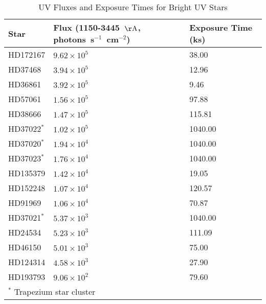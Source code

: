 \begin{table*}
\caption{UV Fluxes and Exposure Times for Bright UV Stars\label{tab:star_fluxes}}
\begin{center}
\begin{tabular}{lll}
\hline
\hline
Star & Flux (1150-3445~${\rm \AA}$, photons~s$^{-1}$~cm$^{-2}$) & Exposure Time (ks) \\
\hline
HD172167 & $9.62 \times 10^5$ & 38.00 \\
HD37468 & $3.94 \times 10^5$ & 12.96 \\
HD36861 & $3.92 \times 10^5$ & 9.46 \\
HD57061 & $1.56 \times 10^5$ & 97.88 \\
HD38666 & $1.47 \times 10^5$ & 115.81 \\
HD37022$^*$ & $1.02 \times 10^5$ & 1040.00 \\
HD37020$^*$ & $1.94 \times 10^4$ & 1040.00 \\
HD37023$^*$ & $1.76 \times 10^4$ & 1040.00 \\
HD135379 & $1.42 \times 10^4$ & 19.05 \\
HD152248 & $1.07 \times 10^4$ & 120.57 \\
HD91969 & $1.06 \times 10^4$ & 70.87 \\
HD37021$^*$ & $5.37 \times 10^3$ & 1040.00 \\
HD24534 & $5.23 \times 10^3$ & 111.09 \\
HD46150 & $5.01 \times 10^3$ & 75.00 \\
HD124314 & $4.58 \times 10^3$ & 27.90 \\
HD193793 & $9.06 \times 10^2$ & 79.60 \\
\hline
\multicolumn{3}{p{.6\textwidth}}{$^*$ Trapezium star cluster}
\end{tabular}
\end{center}
\end{table*}
